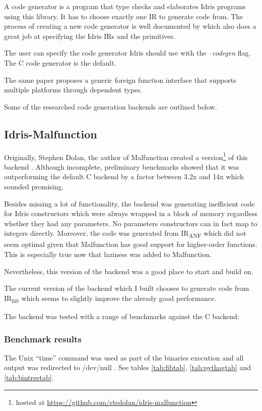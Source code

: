 A code generator is a program that type checks and elaborates
Idris programs using this library.
It has to choose exactly one
IR to generate code from.
The process of creating a new code generator is well
documented by \citep{ElliottIdrisErlang} which also does a great job
at specifying the Idris IRs and the primitives.

The user can specify the code generator Idris should use with
the \emph{--codegen} flag.
The C code generator is the default.

The same paper proposes a generic foreign function interface that
supports multiple platforms through dependent types.

Some of the researched code generation backends are outlined
below.

\subsection{Idris-Malfunction}

Originally, Stephen Dolan, the author of Malfunction created a
version\footnote{hosted at
    \url{https://github.com/stedolan/idris-malfunction}}
of this backend \citep{dolan2016malfunctional}.
Although incomplete, preliminary benchmarks showed that it was
outperforming the default C backend by a factor between 3.2x and 14x
which sounded promising.

Besides missing a lot of functionality, the backend was generating
inefficient code for Idris constructors which were always wrapped
in a block of memory regardless whether they had any parameters.
No parameters constructors can in fact map to integers directly.
Moreover, the code was generated from IR\textsubscript{ANF}
which did not seem optimal given that Malfunction has
good support for higher-order functions.
This is especially true now that laziness was added to Malfunction.

Nevertheless, this version of the backend was a good place to start
and build on.

The current version of the backend which I built chooses
to generate code from IR\textsubscript{lift} which seems to
slightly improve the already good performance.

The backend was tested with a range of benchmarks against the
C backend:

\subsubsection{Benchmark results}
The Unix ``time'' command was used as part of the binaries execution
and all output was redirected to /dev/null \citep{self}.
See tables \hyperref[tab:fibtab]{\ref{tab:fibtab}},
\hyperref[tab:pythagtab]{\ref{tab:pythagtab}} and
\hyperref[tab:bintreetab]{\ref{tab:bintreetab}}.

